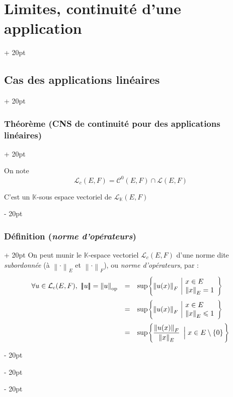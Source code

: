 \documentclass[a4paper, 12pt, twoside]{article}
\newcommand{\K}{\mathbb K}
\newcommand{\set}[1]{\left\{ #1 \right\}}
\newcommand{\norm}[1]{\left\lVert #1 \right\rVert}
\newcommand{\nnorm}[2][-2pt]{{\left\lvert \kern#1 \left\lvert \kern#1 \left\lvert #2 \right\rvert \kern#1 \right\rvert \kern#1 \right\rvert}}
\renewcommand{\le}{\leqslant}
\newcommand{\ind}[1][20pt]{\advance\leftskip + #1}
\newcommand{\deind}[1][20pt]{\advance\leftskip - #1}
\newenvironment{indt}[2][20pt]{#2 \par \ind[#1]}{\par \deind} %
\begin{document}
\begin{indt}{\section{Limites, continuité d'une application}}
\begin{indt}{\subsection{Cas des applications linéaires}}
\begin{indt}{\subsubsection{Théorème (CNS de continuité pour des applications linéaires)}}
                \vspace{12pt}
                
                On note
                \[
                    \mathcal L_c(E, F) = \mathcal C^0(E, F) \cap \mathcal L(E, F)
                \]

                C'est un $\K$-sous espace vectoriel de $\mathcal L_\K(E, F)$
            \end{indt}

            \vspace{12pt}
            
            \begin{indt}{\subsubsection{Définition (\textit{norme d'opérateurs})}}
                On peut munir le $\K$-espace vectoriel $\mathcal L_c(E, F)$ d'une norme dite \emph{subordonnée} (à $\norm \cdot _E$ et $\norm \cdot _F$), ou \emph{norme d'opérateurs}, par :
                \[
                    \begin{array}{rcl}
                        \forall u \in \mathcal L_c(E, F),\
                        \nnorm u
                        =
                        \norm u _{\rm op}
                        &=&
                        \sup\!\set{
                            \norm{u(x)}_F\
                            \begin{array}{|l}
                                x \in E
                                \\
                                \norm x _E = 1
                            \end{array}
                            \vphantom{\dfrac a {\tfrac a a}}
                        }
                        \vspace{6pt}
                        \\
                        &=&
                        \sup\!\set{
                            \norm{u(x)}_F\
                            \begin{array}{|l}
                                x \in E
                                \\
                                \norm x _E \le 1
                            \end{array}
                            \vphantom{\dfrac a {\tfrac a a}}
                        }
                        \vspace{6pt}
                        \\
                        &=&
                        \sup\!\set{
                            \dfrac{\norm{u(x)}_F}{\norm x _E}\
                            \left| \vphantom{\dfrac a a}\right.
                            x \in E \setminus \set 0
                            \vphantom{\dfrac a {\tfrac a a}}
                        }
                    \end{array}
                \]


\end{indt}
\end{indt}
\end{indt}
\end{document}
